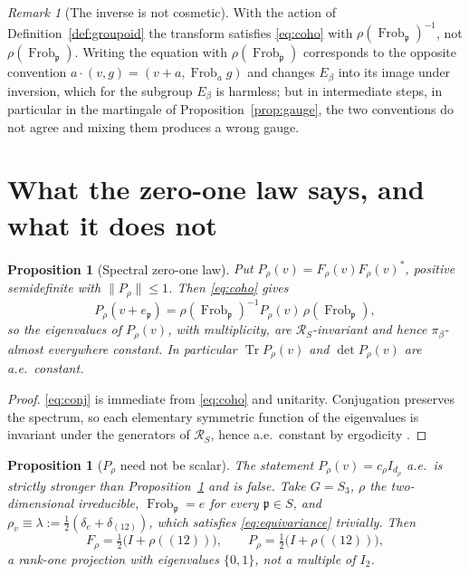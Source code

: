 \documentclass[11pt]{amsart}
\numberwithin{equation}{section}
\newtheorem{proposition}[theorem]{Proposition}
\theoremstyle{definition}
\theoremstyle{remark}
\newtheorem{remark}[theorem]{Remark}
\newcommand{\cR}{\mathcal{R}}
\newcommand{\pp}{\mathfrak{p}}
\newcommand{\Frob}{\operatorname{Frob}}
\newcommand{\Tr}{\operatorname{Tr}}
\begin{document}
\begin{remark}[The inverse is not cosmetic]\label{rem:inverse}
With the action of Definition~\ref{def:groupoid} the transform satisfies \eqref{eq:coho} with
$\rho(\Frob_\pp)^{-1}$, not $\rho(\Frob_\pp)$. Writing the equation with
$\rho(\Frob_\pp)$ corresponds to the opposite convention $a\cdot(v,g)=(v+a,\Frob_ag)$ and
changes $E_\beta$ into its image under inversion, which for the subgroup $E_\beta$ is
harmless; but in intermediate steps, in particular in the martingale of
Proposition~\ref{prop:gauge}, the two conventions do not agree and mixing them produces a
wrong gauge.
\end{remark}

\section{What the zero-one law says, and what it does not}

\begin{proposition}[Spectral zero-one law]\label{prop:zeroone}
Put $P_\rho(v)=F_\rho(v)F_\rho(v)^*$, positive semidefinite with $\|P_\rho\|\le1$. Then
\eqref{eq:coho} gives
\begin{equation}\label{eq:conj}
P_\rho(v+e_\pp)=\rho(\Frob_\pp)^{-1}P_\rho(v)\,\rho(\Frob_\pp),
\end{equation}
so the \emph{eigenvalues} of $P_\rho(v)$, with multiplicity, are $\cR_S$-invariant and hence
$\pi_\beta$-almost everywhere constant. In particular $\Tr P_\rho(v)$ and $\det P_\rho(v)$
are a.e.\ constant.
\end{proposition}

\begin{proof}
\eqref{eq:conj} is immediate from \eqref{eq:coho} and unitarity. Conjugation preserves the
spectrum, so each elementary symmetric function of the eigenvalues is invariant under the
generators of $\cR_S$, hence a.e.\ constant by ergodicity \cite[Lem.~3.1]{Main}.
\end{proof}

\begin{proposition}[$P_\rho$ need not be scalar]\label{prop:notscalar}
The statement $P_\rho(v)=c_\rho I_{d_\rho}$ a.e.\ is strictly stronger than
Proposition~\ref{prop:zeroone} and is false. Take $G=S_3$, $\rho$ the two-dimensional
irreducible, $\Frob_\pp=e$ for every $\pp\in S$, and
$\rho_v\equiv\lambda:=\tfrac12(\delta_e+\delta_{(12)})$, which satisfies
\eqref{eq:equivariance} trivially. Then
\[
F_\rho=\tfrac12\bigl(I+\rho((12))\bigr),\qquad
P_\rho=\tfrac12\bigl(I+\rho((12))\bigr),
\]
a rank-one projection with eigenvalues $\{0,1\}$, not a multiple of $I_2$.
\end{proposition}
\end{document}
